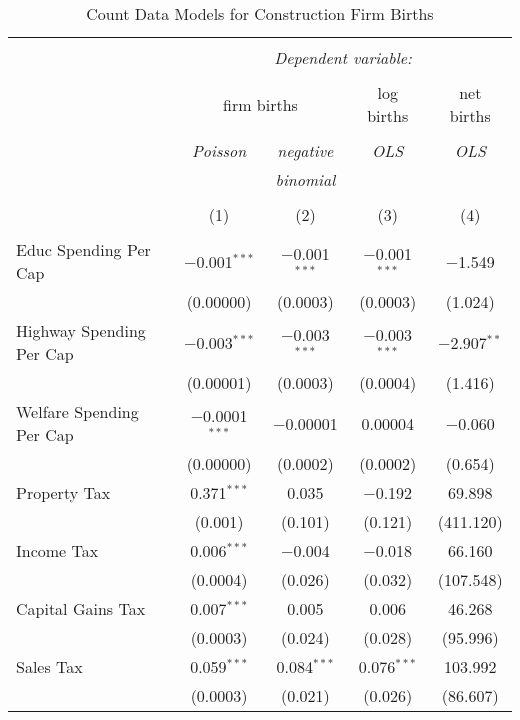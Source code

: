 
\begin{table}[!htbp] \centering 
  \caption{Count Data Models for Construction Firm Births} 
  \label{} 
\begin{tabular}{@{\extracolsep{5pt}}lcccc} 
\\[-1.8ex]\hline 
\hline \\[-1.8ex] 
 & \multicolumn{4}{c}{\textit{Dependent variable:}} \\ 
\cline{2-5} 
\\[-1.8ex] & \multicolumn{2}{c}{firm births} & log births & net births \\ 
\\[-1.8ex] & \textit{Poisson} & \textit{negative} & \textit{OLS} & \textit{OLS} \\ 
 & \textit{} & \textit{binomial} & \textit{} & \textit{} \\ 
\\[-1.8ex] & (1) & (2) & (3) & (4)\\ 
\hline \\[-1.8ex] 
 Educ Spending Per Cap & $-$0.001$^{***}$ & $-$0.001$^{***}$ & $-$0.001$^{***}$ & $-$1.549 \\ 
  & (0.00000) & (0.0003) & (0.0003) & (1.024) \\ 
  Highway Spending Per Cap  & $-$0.003$^{***}$ & $-$0.003$^{***}$ & $-$0.003$^{***}$ & $-$2.907$^{**}$ \\ 
  & (0.00001) & (0.0003) & (0.0004) & (1.416) \\ 
  Welfare Spending Per Cap  & $-$0.0001$^{***}$ & $-$0.00001 & 0.00004 & $-$0.060 \\ 
  & (0.00000) & (0.0002) & (0.0002) & (0.654) \\ 
  Property Tax & 0.371$^{***}$ & 0.035 & $-$0.192 & 69.898 \\ 
  & (0.001) & (0.101) & (0.121) & (411.120) \\ 
  Income Tax & 0.006$^{***}$ & $-$0.004 & $-$0.018 & 66.160 \\ 
  & (0.0004) & (0.026) & (0.032) & (107.548) \\ 
  Capital Gains Tax & 0.007$^{***}$ & 0.005 & 0.006 & 46.268 \\ 
  & (0.0003) & (0.024) & (0.028) & (95.996) \\ 
  Sales Tax & 0.059$^{***}$ & 0.084$^{***}$ & 0.076$^{***}$ & 103.992 \\ 
  & (0.0003) & (0.021) & (0.026) & (86.607) \\ 

\end{tabular}
\end{table}
